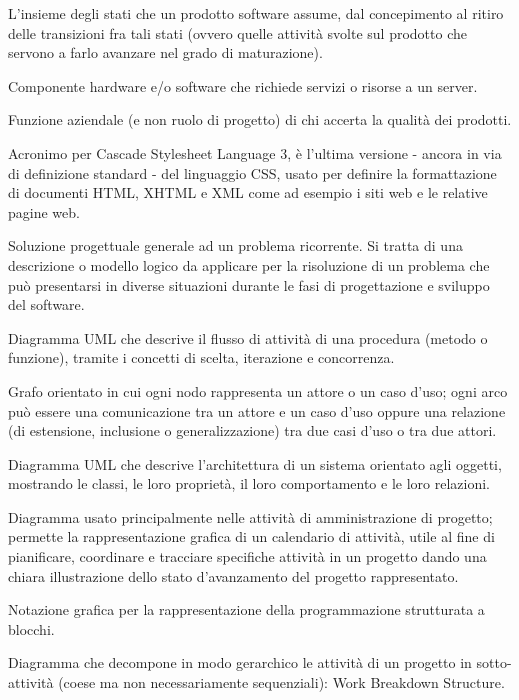 \item[ciclo di vita (di un prodotto)] L'insieme degli stati che un prodotto software assume, dal concepimento al ritiro delle transizioni fra tali stati (ovvero quelle attività svolte sul prodotto che servono a farlo avanzare nel grado di maturazione).
\item[client] Componente hardware e/o software che richiede servizi o risorse a un server.
\item[Controllore della qualità] Funzione aziendale (e non ruolo di progetto) di chi accerta la qualità dei prodotti.
\item[CSS3] Acronimo per Cascade Stylesheet Language 3, è l'ultima versione - ancora in via di definizione standard - del linguaggio CSS, usato per definire la formattazione di documenti HTML, XHTML e XML come ad esempio i siti web e le relative pagine web.
\item[Design pattern] Soluzione progettuale generale ad un problema ricorrente. Si tratta di una descrizione o modello logico da applicare per la risoluzione di un problema che può presentarsi in diverse situazioni durante le fasi di progettazione e sviluppo del software.
\item[diagramma delle attività] Diagramma UML che descrive il flusso di attività di una procedura (metodo o funzione), tramite i concetti di scelta, iterazione e concorrenza.
\item[Diagramma dei casi d'uso] Grafo orientato in cui ogni nodo rappresenta un attore o un caso d'uso; ogni arco può essere una comunicazione tra un attore e un caso d'uso oppure una relazione (di estensione, inclusione o generalizzazione) tra due casi d'uso o tra due attori.
\item[diagramma delle classi] Diagramma UML che descrive l'architettura di un sistema orientato agli oggetti, mostrando le classi, le loro proprietà, il loro comportamento e le loro relazioni.
\item[Diagramma di Gantt] Diagramma usato principalmente nelle attività di amministrazione di progetto; permette la rappresentazione grafica di un calendario di attività, utile al fine di pianificare, coordinare e tracciare specifiche attività in un progetto dando una chiara illustrazione dello stato d’avanzamento del progetto rappresentato.
\item[Diagramma Nassi–Shneiderman] Notazione grafica per la rappresentazione della programmazione strutturata a blocchi. 
\item[Diagramma WBS] Diagramma che decompone in modo gerarchico le attività di un progetto in sotto-attività (coese ma non necessariamente sequenziali): Work Breakdown Structure.
